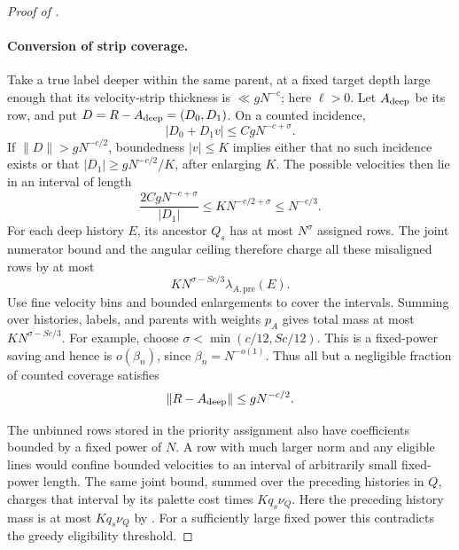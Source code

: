 \begin{proof}[Proof of ]
\paragraph{Conversion of strip coverage.} Take a true label deeper
within the same parent, at a fixed target depth large enough that
its velocity-strip thickness is \(\ll gN^{-c}\); here \(\ell>0\).
Let \(A_{\rm deep}\) be its row, and put
\(D=R-A_{\rm deep}=(D_0,D_1)\).  On a counted incidence,
\[
 |D_0+D_1v|\le CgN^{-c+\sigma}.
\]
If \(\|D\|>gN^{-c/2}\), boundedness \(|v|\le K\) implies
either that no such incidence exists or that
\(|D_1|\ge gN^{-c/2}/K\), after enlarging \(K\).
The possible velocities then lie in an interval of length
\begin{equation}
 \frac{2CgN^{-c+\sigma}}{|D_1|}
       \le KN^{-c/2+\sigma}\le N^{-c/3}.
 \label{a03:strip-velocity-saving}
\end{equation}
For each deep history \(E\), its ancestor \(Q_s\) has at most
\(N^\sigma\) assigned rows.  The joint numerator bound
 and the angular ceiling therefore
charge all these misaligned rows by at most
\[
 K N^{\sigma-Sc/3}\lambda_{A,\mathrm{pre}}(E).
\]
Use fine velocity bins and bounded enlargements to cover the
intervals.  Summing over histories, labels, and parents with
weights \(p_A\) gives total mass at most
\(KN^{\sigma-Sc/3}\).  For example, choose
\(\sigma<\min(c/12,Sc/12)\).  This is a fixed-power saving and
hence is \(o(\beta_n)\), since \(\beta_n=N^{-o(1)}\).
Thus all but a negligible fraction of counted coverage satisfies
\begin{equation}
 \|R-A_{\rm deep}\|\le gN^{-c/2}.
 \label{a03:strip-row-alignment}
\end{equation}

The unbinned rows stored in the priority assignment also have
coefficients bounded by a fixed power of \(N\).  A row with much
larger norm and any eligible lines would confine bounded velocities
to an interval of arbitrarily small fixed-power length.  The same
joint bound, summed over the preceding histories in \(Q\), charges
that interval by its palette cost times \(Kq_s\nu_Q\).
Here the preceding history mass is at most \(Kq_s\nu_Q\) by
.  For a sufficiently large fixed
power this contradicts the greedy eligibility threshold.


\end{proof}

